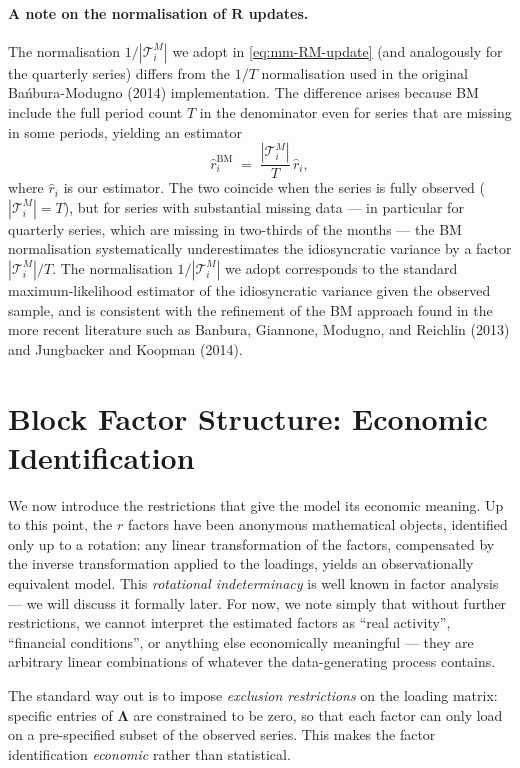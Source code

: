 \documentclass[11pt, a4paper, oneside]{article}
\newcommand{\mL}{\boldsymbol{\Lambda}}
\newcommand{\mR}{\mathbf{R}}
\begin{document}
\paragraph{A note on the normalisation of $\mR$ updates.}
The normalisation $1/|\mathcal{T}^M_i|$ we adopt in 
\eqref{eq:mm-RM-update} (and analogously for the quarterly series) 
differs from the $1/T$ normalisation used in the original 
Bańbura-Modugno (2014) implementation. The difference arises because 
BM include the full period count $T$ in the denominator even for 
series that are missing in some periods, yielding an estimator
\[
\hat{r}_i^{\text{BM}} \;=\; \frac{|\mathcal{T}^M_i|}{T}\, \hat{r}_i,
\]
where $\hat{r}_i$ is our estimator. The two coincide when the series 
is fully observed ($|\mathcal{T}^M_i| = T$), but for series with 
substantial missing data — in particular for quarterly series, which 
are missing in two-thirds of the months — the BM normalisation 
systematically underestimates the idiosyncratic variance by a factor 
$|\mathcal{T}^M_i|/T$. The normalisation $1/|\mathcal{T}^M_i|$ we 
adopt corresponds to the standard maximum-likelihood estimator of the 
idiosyncratic variance given the observed sample, and is consistent 
with the refinement of the BM approach found in the more recent 
literature such as Banbura, Giannone, Modugno, and Reichlin (2013) 
and Jungbacker and Koopman (2014).

\newpage

\section{Block Factor Structure: Economic Identification}
\label{sec:block-structure}

We now introduce the restrictions that give the model its economic
meaning. Up to this point, the $r$ factors have been anonymous
mathematical objects, identified only up to a rotation: any linear
transformation of the factors, compensated by the inverse
transformation applied to the loadings, yields an observationally
equivalent model. This \emph{rotational indeterminacy} is well known
in factor analysis — we will discuss it formally later. For now, we note simply
that without further restrictions, we cannot interpret the estimated
factors as ``real activity'', ``financial conditions'', or anything
else economically meaningful — they are arbitrary linear combinations
of whatever the data-generating process contains.

The standard way out is to impose \emph{exclusion restrictions} on the
loading matrix: specific entries of $\mL$ are constrained
to be zero, so that each factor can only load on a pre-specified
subset of the observed series. This makes the factor identification
\emph{economic} rather than statistical.
\end{document}
